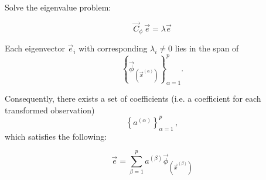\begin{frame}{\subsubsecname}

Solve the eigenvalue problem:

\begin{equation} \label{eq:eig}
\vec C_{\phi} \, \vec e = \lambda \vec e
\end{equation}

Each eigenvector $\vec e_i$ with corresponding $\lambda_i \ne 0$ lies in the span of 
\begin{equation}
\left\{
\vec{\phi}_{(\vec{x}^{(\alpha)})}
\right\}_{\alpha=1}^{p}.
\end{equation}

\pause

Consequently, there exists a set of coefficients (i.e. a coefficient for each transformed observation)
\begin{equation}
\left\{
a^{(\alpha)}
\right\}_{\alpha=1}^{p}\,,
\end{equation} which satisfies the following:

\begin{equation}
\label{eq:ephi}
\vec e = \sum^{p}_{\beta=1} a^{(\beta)} \vec{\phi}_{(\vec{x}^{(\beta)})}
\end{equation}


\end{frame}

